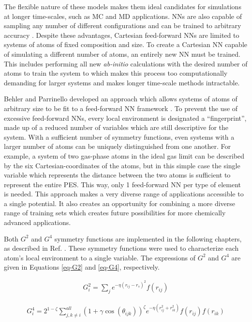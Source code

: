 \documentclass[12pt]{cmuthesis}
\begin{document}
The flexible nature of these models makes them ideal candidates for simulations at longer time-scales, such as MC and MD applications. NNs are also capable of sampling any number of different configurations and can be trained to arbitrary accuracy \cite{hornik-1989-multil}. Despite these advantages, Cartesian feed-forward NNs are limited to systems of atoms of fixed composition and size. To create a Cartesian NN capable of simulating a different number of atoms, an entirely new NN must be trained. This includes performing all new \emph{ab-initio} calculations with the desired number of atoms to train the system to which makes this process too computationally demanding for larger systems and makes longer time-scale methods intractable.

Behler and Parrinello developed an approach which allows systems of atoms of arbitrary size to be fit to a feed-forward NN framework \cite{behler-2007-gener-neural}. To prevent the use of excessive feed-forward NNs, every local environment is designated a ``fingerprint'', made up of a reduced number of variables which are still descriptive for the system. With a sufficient number of symmetry functions, even systems with a larger number of atoms can be uniquely distinguished from one another. For example, a system of two gas-phase atoms in the ideal gas limit can be described by the six Cartesian-coordinates of the atoms, but in this simple case the single variable which represents the distance between the two atoms is sufficient to represent the entire PES. This way, only 1 feed-forward NN per type of element is needed. This approach makes a very diverse range of applications accessible to a single potential. It also creates an opportunity for combining a more diverse range of training sets which creates future possibilities for more chemically advanced applications.

Both \(G^{2}\) and \(G^{4}\) symmetry functions are implemented in the following chapters, as described in Ref. . These symmetry functions were used to characterize each atom's local environment to a single variable. The expressions of \(G^{2}\) and \(G^{4}\) are given in Equations \ref{eq-G2} and \ref{eq-G4}, respectively.

\begin{eqnarray} \label{eq-G2}
G_{i}^{2} = \sum_{j}e^{-\eta(r_{ij} - r_{s})^2} f(r_{ij})
\end{eqnarray}

\begin{eqnarray} \label{eq-G4}
G_{i}^{4} = 2^{1-\zeta} \sum^{all}_{j,k \neq i} (1 + \gamma \cos\left(\theta_{ijk}\right))^{\zeta} e^{-\eta(r^{2}_{ij}+r_{ik}^2)} f(r_{ij}) f(r_{ik})
\end{eqnarray}
\end{document}
